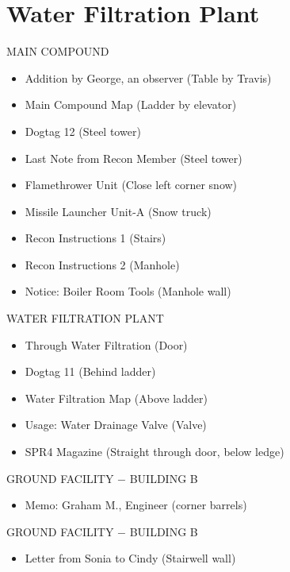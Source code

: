 \chapter{Water Filtration Plant}

\begin{subregion}{MAIN COMPOUND}
    \begin{itemize}
        \item Addition by George, an observer (Table by Travis)
        \item Main Compound Map (Ladder by elevator)
        \item Dogtag 12 (Steel tower)
        \item Last Note from Recon Member (Steel tower)
        \item Flamethrower Unit (Close left corner snow)
        \item Missile Launcher Unit-A (Snow truck)
        \item Recon Instructions 1 (Stairs)
        \item Recon Instructions 2 (Manhole)
        \item Notice: Boiler Room Tools (Manhole wall)
    \end{itemize}
\end{subregion}

\begin{subregion}{WATER FILTRATION PLANT}
    \begin{itemize}
        \item Through Water Filtration (Door)
        \item Dogtag 11 (Behind ladder)
        \item Water Filtration Map (Above ladder)
        \item Usage: Water Drainage Valve (Valve)
        \item SPR4 Magazine (Straight through door, below ledge)
    \end{itemize}
\end{subregion}

\begin{subregion}{GROUND FACILITY $\boldsymbol{-}$ BUILDING B}
    \begin{itemize}
        \item Memo: Graham M., Engineer (corner barrels)
    \end{itemize}
\end{subregion}

\begin{subregion}{GROUND FACILITY $\boldsymbol{-}$ BUILDING B}
    \begin{itemize}
        \item Letter from Sonia to Cindy (Stairwell wall)
    \end{itemize}
\end{subregion}

